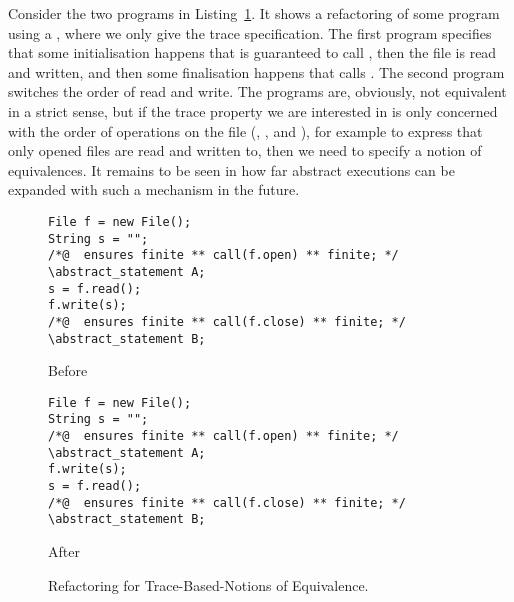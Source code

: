 Consider the two programs in Listing~\ref{lst:sth}.
It shows a refactoring of some program using a , where we only give the trace specification.
The first program specifies that some initialisation happens that is guaranteed to call , then the file is read and written,
and then some finalisation happens that calls .
The second program switches the order of read and write.
The programs are, obviously, not equivalent in a strict sense, but if the trace property we are interested in is only concerned with the order of operations on the file 
(, ,  and ), for example to express that only opened files are read and written to, then we need to specify a notion of equivalences.
It remains to be seen in how far abstract executions can be expanded with such a mechanism in the future.

\begin{figure}[tbp]
\captionsetup{type=lstlisting}
\centering
\begin{sublstlisting}{.8\linewidth}
\begin{lstlisting}[style=refinity]
File f = new File();
String s = "";
/*@  ensures finite ** call(f.open) ** finite; */
\abstract_statement A;     
s = f.read();
f.write(s);
/*@  ensures finite ** call(f.close) ** finite; */
\abstract_statement B;     
\end{lstlisting}
\caption{Before}
\hspace{0.5em}
\end{sublstlisting}
\begin{sublstlisting}{.8\linewidth}\vspace{1mm}
\begin{lstlisting}[style=refinity]
File f = new File();
String s = "";
/*@  ensures finite ** call(f.open) ** finite; */
\abstract_statement A;     
f.write(s);
s = f.read();
/*@  ensures finite ** call(f.close) ** finite; */
\abstract_statement B;     
\end{lstlisting}
\caption{After}
\end{sublstlisting}
\caption{Refactoring for Trace-Based-Notions of Equivalence.}
\label{lst:sth}
\end{figure}




